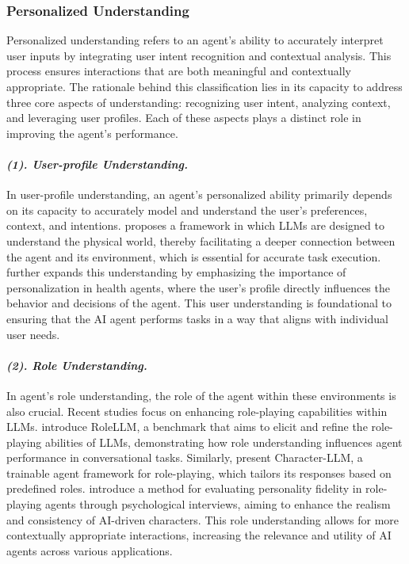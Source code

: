 \subsubsection{\textbf{Personalized Understanding}}
Personalized understanding refers to an agent’s ability to accurately interpret user inputs by integrating user intent recognition and contextual analysis. This process ensures interactions that are both meaningful and contextually appropriate. The rationale behind this classification lies in its capacity to address three core aspects of understanding: recognizing user intent, analyzing context, and leveraging user profiles. Each of these aspects plays a distinct role in improving the agent's performance. %

\paragraph{\textbf{\textit{{(1). User-profile Understanding.}}}}
In user-profile understanding, an agent's personalized ability primarily depends on its capacity to accurately model and understand the user's preferences, context, and intentions. \citet{xu2024penetrative} proposes a framework in which LLMs are designed to understand the physical world, thereby facilitating a deeper connection between the agent and its environment, which is essential for accurate task execution. \citet{abbasian2023conversational} further expands this understanding by emphasizing the importance of personalization in health agents, where the user’s profile directly influences the behavior and decisions of the agent. This user understanding is foundational to ensuring that the AI agent performs tasks in a way that aligns with individual user needs.

\paragraph{\textbf{\textit{{(2). Role Understanding.}}}}
In agent's role understanding, the role of the agent within these environments is also crucial. Recent studies focus on enhancing role-playing capabilities within LLMs. \citet{wang2023rolellm} introduce RoleLLM, a benchmark that aims to elicit and refine the role-playing abilities of LLMs, demonstrating how role understanding influences agent performance in conversational tasks. Similarly, \citet{shao2023character} present Character-LLM, a trainable agent framework for role-playing, which tailors its responses based on predefined roles. \citet{wang2023incharacter} introduce a method for evaluating personality fidelity in role-playing agents through psychological interviews, aiming to enhance the realism and consistency of AI-driven characters. This role understanding allows for more contextually appropriate interactions, increasing the relevance and utility of AI agents across various applications. %

